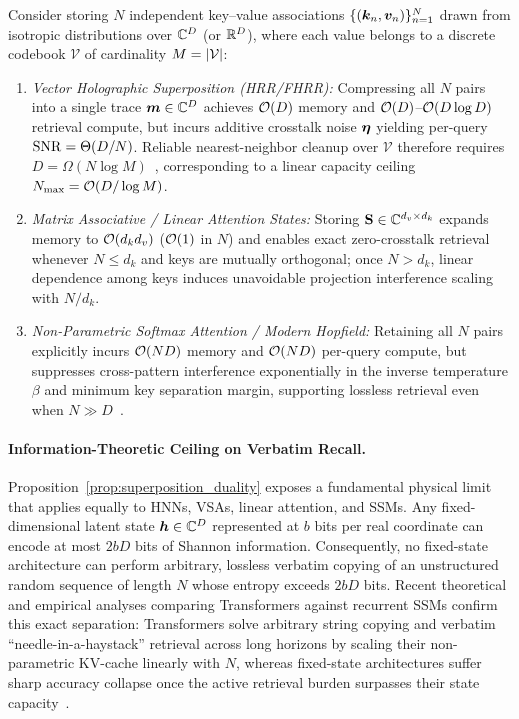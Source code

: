 \begin{proposition}\label{prop:superposition_duality}
Consider storing $N$ independent key--value associations $\{(\boldsymbol{k}_n, \boldsymbol{v}_n)\}_{n=1}^N$ drawn from isotropic distributions over $\mathbb{C}^D$ (or $\mathbb{R}^D$), where each value belongs to a discrete codebook $\mathcal{V}$ of cardinality $M = \left\lvert \mathcal{V} \right\rvert$:
\begin{enumerate}
    \item \emph{Vector Holographic Superposition (HRR/FHRR):} Compressing all $N$ pairs into a single trace $\boldsymbol{m} \in \mathbb{C}^D$ achieves $\mathcal{O}\!\left(D\right)$ memory and $\mathcal{O}\!\left(D\right)$--$\mathcal{O}\!\left(D \log D\right)$ retrieval compute, but incurs additive crosstalk noise $\boldsymbol{\eta}$ yielding per-query $\mathrm{SNR} = \Theta(D / N)$. Reliable nearest-neighbor cleanup over $\mathcal{V}$ therefore requires $D = \Omega(N \log M)$~\cite{FRADY_CAPACITY_VSA}, corresponding to a linear capacity ceiling $N_{\max} = \mathcal{O}\!\left(D / \log M\right)$.
    \item \emph{Matrix Associative / Linear Attention States:} Storing $\mathbf{S} \in \mathbb{C}^{d_v \times d_k}$ expands memory to $\mathcal{O}\!\left(d_k d_v\right)$ ($\mathcal{O}\!\left(1\right)$ in $N$) and enables exact zero-crosstalk retrieval whenever $N \le d_k$ and keys are mutually orthogonal; once $N > d_k$, linear dependence among keys induces unavoidable projection interference scaling with $N / d_k$.
    \item \emph{Non-Parametric Softmax Attention / Modern Hopfield:} Retaining all $N$ pairs explicitly incurs $\mathcal{O}\!\left(ND\right)$ memory and $\mathcal{O}\!\left(ND\right)$ per-query compute, but suppresses cross-pattern interference exponentially in the inverse temperature $\beta$ and minimum key separation margin, supporting lossless retrieval even when $N \gg D$~\cite{RAMSAUER_MODERN_HOPFIELD}.
\end{enumerate}
\end{proposition}

\paragraph{Information-Theoretic Ceiling on Verbatim Recall.}
Proposition~\ref{prop:superposition_duality} exposes a fundamental physical limit that applies equally to HNNs, VSAs, linear attention, and SSMs.
Any fixed-dimensional latent state $\boldsymbol{h} \in \mathbb{C}^D$ represented at $b$ bits per real coordinate can encode at most $2bD$ bits of Shannon information.
Consequently, no fixed-state architecture can perform arbitrary, lossless verbatim copying of an unstructured random sequence of length $N$ whose entropy exceeds $2bD$ bits.
Recent theoretical and empirical analyses comparing Transformers against recurrent SSMs confirm this exact separation: Transformers solve arbitrary string copying and verbatim ``needle-in-a-haystack'' retrieval across long horizons by scaling their non-parametric KV-cache linearly with $N$, whereas fixed-state architectures suffer sharp accuracy collapse once the active retrieval burden surpasses their state capacity~\cite{JELASSI_2024_REPEAT_AFTER_ME}.

